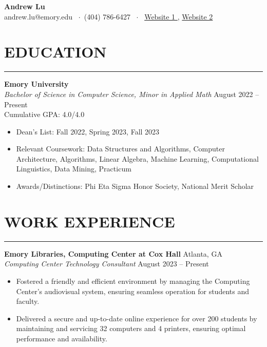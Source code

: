 \documentclass[10.5pt]{article}
\begin{document}
\noindent
\begin{center}
{\Large \textbf{\fontsize{14pt}{14pt}\selectfont Andrew Lu}} \\
andrew.lu@emory.edu \faEnvelope~$\cdot$~(404) 786-6427 \faPhone~$\cdot$~
\href{https://andrewtlu.github.io}{Website 1 \faInfo }, \href{https://www.boredbutton.com}{Website 2 \faInfo }
\end{center}

\section*{\large\textbf{EDUCATION}}
\vspace{-\baselineskip}
\noindent\rule{\textwidth}{0.4pt}

\noindent
\textbf{Emory University} \\
\emph{Bachelor of Science in Computer Science, Minor in Applied Math} \hfill August 2022 -- Present \\ 
Cumulative GPA: 4.0/4.0 
\begin{itemize}
\item Dean's List: Fall 2022, Spring 2023, Fall 2023
\item Relevant Coursework: Data Structures and Algorithms, Computer Architecture, Algorithms, Linear Algebra, Machine Learning, Computational Linguistics, Data Mining, Practicum
\item Awards/Distinctions: Phi Eta Sigma Honor Society, National Merit Scholar
\end{itemize}
 \vspace{-\baselineskip}
\section*{\large\textbf{WORK EXPERIENCE}} 
 \vspace{-\baselineskip} 
\noindent\rule{\textwidth}{0.4pt} 


\noindent
\textbf{Emory Libraries, Computing Center at Cox Hall} \hfill {Atlanta, GA}\\
\emph{Computing Center Technology Consultant} \hfill {August 2023} -- {Present}
\begin{itemize}
    \item Fostered a friendly and efficient environment by managing the Computing Center's audiovisual system, ensuring seamless operation for students and faculty. \item Delivered a secure and up-to-date online experience for over 200 students by maintaining and servicing 32 computers and 4 printers, ensuring optimal performance and availability.
\end{itemize}
\end{document}
